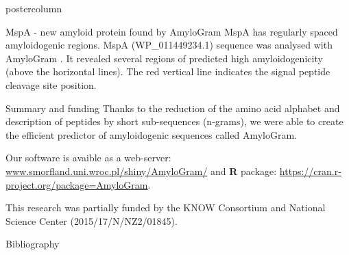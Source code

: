 \documentclass[final]{beamer}\usepackage[]{graphicx}\usepackage[]{color}
\begin{document}
\begin{frame}
\begin{columns}
\begin{column}{.48\textwidth}
\begin{beamercolorbox}[center,wd=\textwidth]{postercolumn}
\begin{minipage}[T]{.95\textwidth}
{\begin{block}{MspA - new amyloid protein found by AmyloGram}
MspA has regularly spaced amyloidogenic regions. MspA (WP\_011449234.1) sequence was analysed \citep{christensen_sheaths_2018} with AmyloGram \citep{burdukiewicz_amyloidogenic_2017}. It revealed several regions of predicted high amyloidogenicity (above the horizontal lines). The red vertical line indicates the signal peptide cleavage site position.




\end{block}
\vfill

\begin{block}{Summary and funding}
Thanks to the reduction of the amino acid alphabet and description of peptides by 
short sub-sequences (n-grams), we were able to create the efficient predictor 
of amyloidogenic sequences called AmyloGram.

\bigskip

Our software is avaible as a web-server: \url{www.smorfland.uni.wroc.pl/shiny/AmyloGram/} and \textbf{R} package: \url{https://cran.r-project.org/package=AmyloGram}.

\small{This research was partially funded by the KNOW Consortium and National Science Center (2015/17/N/NZ2/01845).}

\end{block}
\vfill


 \begin{block}{Bibliography}
  \tiny{
  
  
  }
  \end{block}
  \vfill


}
\end{minipage}
\end{beamercolorbox}
\end{column}
\end{columns}  
\end{frame}
\end{document}
